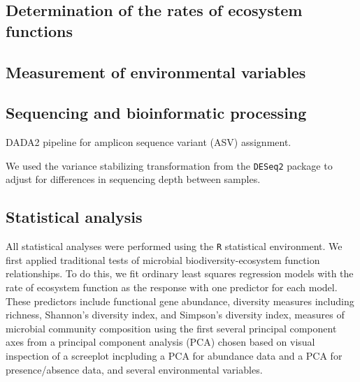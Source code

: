 \documentclass{article}
\begin{document}
\subsection{Determination of the rates of ecosystem functions}

\subsection{Measurement of environmental variables}

\subsection{Sequencing and bioinformatic processing}

DADA2 pipeline for amplicon sequence variant (ASV) assignment.

We used the variance stabilizing transformation from the \texttt{DESeq2}
package to adjust for differences in sequencing depth between samples. 

\subsection{Statistical analysis}

All statistical analyses were performed using the \texttt{R} statistical
environment. 
We first applied traditional tests of microbial biodiversity-ecosystem function
relationships. To do this, we fit ordinary least squares regression models with
the rate of ecosystem function as the response with one predictor for each
model. These predictors include functional gene abundance,
diversity measures including richness, Shannon's diversity index, and Simpson's
diversity index, measures of microbial community composition using the first
several principal component axes from a principal component
analysis (PCA) chosen based on visual inspection of a screeplot incpluding a PCA for
abundance data and a PCA for presence/absence data, and several 
environmental variables. 
\end{document}

